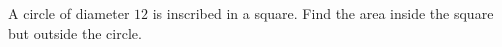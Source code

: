 A circle of diameter $12$ is inscribed in a square. Find the area inside the square but outside the circle.
